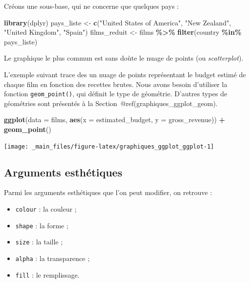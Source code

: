 \documentclass[
  11pt,
]{book}
\newenvironment{Shaded}{\begin{snugshade}}{\end{snugshade}}
\newcommand{\DataTypeTok}[1]{\textcolor[rgb]{0.13,0.29,0.53}{#1}}
\newcommand{\KeywordTok}[1]{\textcolor[rgb]{0.13,0.29,0.53}{\textbf{#1}}}
\newcommand{\NormalTok}[1]{#1}
\newcommand{\OperatorTok}[1]{\textcolor[rgb]{0.81,0.36,0.00}{\textbf{#1}}}
\newcommand{\StringTok}[1]{\textcolor[rgb]{0.31,0.60,0.02}{#1}}
\providecommand{\tightlist}{%
  \setlength{\itemsep}{0pt}\setlength{\parskip}{0pt}}
\numberwithin{equation}{section}
\numberwithin{countremarque}{section}
\begin{document}
Créons une sous-base, qui ne concerne que quelques pays :

\begin{Shaded}
\begin{Highlighting}[]
\KeywordTok{library}\NormalTok{(dplyr)}
\NormalTok{pays\_liste \textless{}{-}}\StringTok{ }
\StringTok{  }\KeywordTok{c}\NormalTok{(}\StringTok{"United States of America"}\NormalTok{, }\StringTok{"New Zealand"}\NormalTok{,}
    \StringTok{"United Kingdom"}\NormalTok{, }\StringTok{"Spain"}\NormalTok{)}
\NormalTok{films\_reduit \textless{}{-}}\StringTok{ }
\StringTok{  }\NormalTok{films }\OperatorTok{\%\textgreater{}\%}\StringTok{ }
\StringTok{  }\KeywordTok{filter}\NormalTok{(country }\OperatorTok{\%in\%}\StringTok{ }\NormalTok{pays\_liste)}
\end{Highlighting}
\end{Shaded}

Le graphique le plus commun est sans doùte le nuage de points (ou \emph{scatterplot}).

L'exemple suivant trace des un nuage de points représentant le budget estimé de chaque film en fonction des recettes brutes. Nous avons besoin d'utiliser la fonction \texttt{geom\_point()}, qui définit le type de géométrie. D'autres types de géométries sont présentés à la Section~@ref(graphiques\_ggplot\_geom).

\begin{Shaded}
\begin{Highlighting}[]
\KeywordTok{ggplot}\NormalTok{(}\DataTypeTok{data =}\NormalTok{ films, }\KeywordTok{aes}\NormalTok{(}\DataTypeTok{x =}\NormalTok{ estimated\_budget, }\DataTypeTok{y =}\NormalTok{ gross\_revenue)) }\OperatorTok{+}
\StringTok{  }\KeywordTok{geom\_point}\NormalTok{()}
\end{Highlighting}
\end{Shaded}

\begin{center}\texttt{[image: \_main\_files/figure-latex/graphiques\_ggplot\_ggplot-1]} \end{center}

\hypertarget{graphiques_ggplot_aes}{%
\subsection{Arguments esthétiques}\label{graphiques_ggplot_aes}}

Parmi les arguments esthétiques que l'on peut modifier, on retrouve :

\begin{itemize}
\tightlist
\item
  \texttt{colour} : la couleur ;
\item
  \texttt{shape} : la forme ;
\item
  \texttt{size} : la taille ;
\item
  \texttt{alpha} : la transparence ;
\item
  \texttt{fill} : le remplissage.
\end{itemize}
\end{document}

